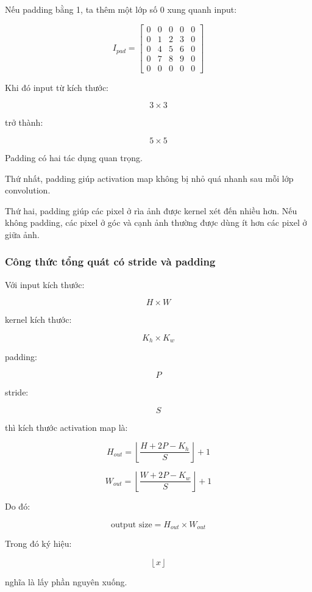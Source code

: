Nếu padding bằng 1, ta thêm một lớp số 0 xung quanh input:

\[
I_{pad}=
\begin{bmatrix}
0 & 0 & 0 & 0 & 0\\
0 & 1 & 2 & 3 & 0\\
0 & 4 & 5 & 6 & 0\\
0 & 7 & 8 & 9 & 0\\
0 & 0 & 0 & 0 & 0
\end{bmatrix}
\]

Khi đó input từ kích thước:

\[
    3 \times 3
\]

trở thành:

\[
    5 \times 5
\]

Padding có hai tác dụng quan trọng.

Thứ nhất, padding giúp activation map không bị nhỏ quá nhanh sau mỗi lớp convolution.

Thứ hai, padding giúp các pixel ở rìa ảnh được kernel xét đến nhiều hơn. Nếu không padding, các pixel ở góc và cạnh ảnh thường được dùng ít hơn các pixel ở giữa ảnh.

\subsubsection{Công thức tổng quát có stride và padding}

Với input kích thước:

\[
    H \times W
\]

kernel kích thước:

\[
    K_h \times K_w
\]

padding:

\[
    P
\]

stride:

\[
    S
\]

thì kích thước activation map là:

\[
    H_{out}
    =
    \left\lfloor
    \frac{H+2P-K_h}{S}
    \right\rfloor
    +1
\]

\[
    W_{out}
    =
    \left\lfloor
    \frac{W+2P-K_w}{S}
    \right\rfloor
    +1
\]

Do đó:

\[
    \text{output size}
    =
    H_{out}
    \times
    W_{out}
\]

Trong đó ký hiệu:

\[
    \left\lfloor x \right\rfloor
\]

nghĩa là lấy phần nguyên xuống.

